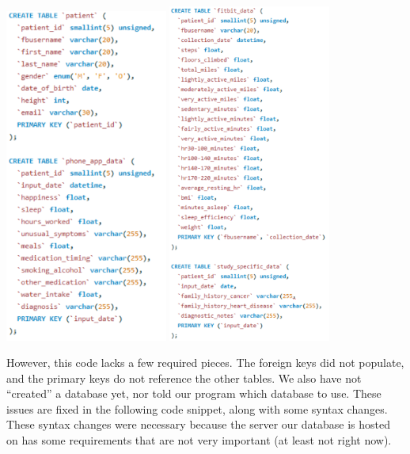 \documentclass[]{book}
\begin{document}
\includegraphics[width=0.40000\textwidth]{./images/a1.png}
\includegraphics[width=0.40000\textwidth]{./images/a2.png}

However, this code lacks a few required pieces. The foreign keys did not
populate, and the primary keys do not reference the other tables. We
also have not ``created'' a database yet, nor told our program which
database to use. These issues are fixed in the following code snippet,
along with some syntax changes. These syntax changes were necessary
because the server our database is hosted on has some requirements that
are not very important (at least not right now).
\end{document}

